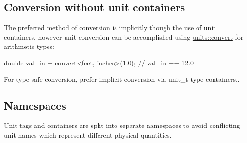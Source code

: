 \subsection*{Conversion without unit containers }

The preferred method of conversion is implicitly though the use of unit containers, however unit conversion can be accomplished using {\ttfamily \hyperlink{group___conversion_gae7541dbcd66420e011c82ac58ef7723c}{units\+::convert}} for arithmetic types\+: \begin{DoxyVerb}double val_in = convert<feet, inches>(1.0); // val_in == 12.0
\end{DoxyVerb}


For type-\/safe conversion, prefer implicit conversion via unit\+\_\+t type containers..

\subsection*{Namespaces }

Unit tags and containers are split into separate namespaces to avoid conflicting unit names which represent different physical quantities.

